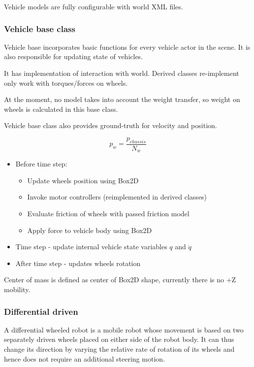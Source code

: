 \documentclass[a4paper,11pt]{article}
\begin{document}
Vehicle models are fully configurable with world XML files. 

\subsubsection{Vehicle base class}

Vehicle base incorporates basic functions for every vehicle actor in the scene. It is also responsible for updating state of vehicles.

It has implementation of interaction with world. Derived classes re-implement only work with torques/forces on wheels. 

At the moment, no model takes into account the weight transfer, so weight on wheels is calculated in this base class.

Vehicle base class also provides ground-truth for velocity and position. 
\begin{center}
\[
p_w = \frac{p_{chassis}}{N_w}
\]
\end{center}

\begin{itemize}
	\item Before time step:
	\begin{itemize}
		\item Update wheels position using Box2D
		\item Invoke motor controllers (reimplemented in derived classes)
		\item Evaluate friction of wheels with passed friction model
		\item Apply force to vehicle body using Box2D
	\end{itemize}
	\item Time step - update internal vehicle state variables $q$ and $\dot{q}$
	\item After time step - updates wheels rotation		
\end{itemize}

Center of mass is defined as center of Box2D shape, currently there is no +Z mobility. 
 
\subsubsection{Differential driven}

A differential wheeled robot is a mobile robot whose movement is based on two separately driven wheels placed on either side of the robot body. It can thus change its direction by varying the relative rate of rotation of its wheels and hence does not require an additional steering motion.
\end{document}
